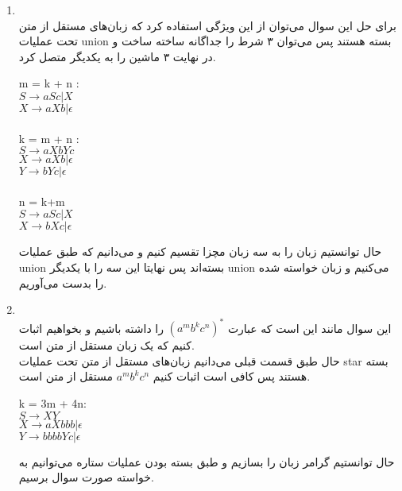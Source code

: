 \begin{enumerate}
    \item \phantom{text}
          \\
          برای حل این سوال می‌توان از این ویژگی استفاده کرد که زبان‌های مستقل از متن تحت عملیات  union بسته هستند پس می‌توان ۳ شرط را جداگانه ساخته ساخت و در نهایت ۳ ماشین را به یکدیگر متصل کرد.
          \begin{latin}
              m = k + n :
              \\
              $S \rightarrow aSc|X$\\
              $X \rightarrow aXb | \epsilon$
              \\\\
              k = m + n :
              \\
              $S\rightarrow aXbYc$\\
              $X \rightarrow aXb | \epsilon$\\
              $Y \rightarrow bYc | \epsilon$
              \\\\
              n = k+m
              \\
              $S \rightarrow aSc | X$\\
              $X \rightarrow bXc | \epsilon$
          \end{latin}
          حال توانستیم زبان را به سه زبان مچزا تقسیم کنیم و می‌دانیم که طبق عملیات union بسته‌اند پس نهایتا این سه را با یکدیگر union می‌کنیم و زبان خواسته شده را بدست می‌آوریم.
    \item \phantom{text}
          \\
        این سوال مانند این است که عبارت $(a^mb^kc^n)^*$ را داشته باشیم و بخواهیم اثبات کنیم که یک زبان مستقل از متن است.\\
        حال طبق قسمت قبلی می‌دانیم زبان‌های مستقل از متن تحت عملیات star بسته هستند پس کافی است اثبات کنیم $a^mb^kc^n$ مستقل از متن است.\\
        \begin{latin}
            k = 3m + 4n:
            \\
            $S \rightarrow XY$\\
            $X \rightarrow aXbbb | \epsilon$\\
            $Y \rightarrow bbbbYc | \epsilon$
        \end{latin}
        حال توانستیم گرامر زبان را بسازیم و طبق بسته بودن عملیات ستاره می‌توانیم به خواسته صورت سوال برسیم.
           
\end{enumerate}